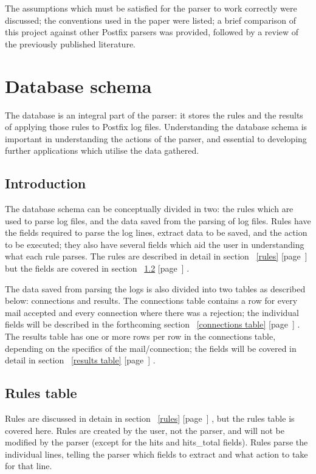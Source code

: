 \documentclass[a4paper,12pt,draft]{article}
\newcommand{\refwithpage}[1]{%
    \empty{}\ref{#1} [page~\pageref{#1}]%
}
\begin{document}
The assumptions which must be satisfied for the parser to work correctly
were discussed; the conventions used in the paper were listed; a brief
comparison of this project against other Postfix parsers was provided,
followed by a review of the previously published literature.

\section{Database schema}
\label{database schema}

The database is an integral part of the parser: it stores the rules and the
results of applying those rules to Postfix log files.  Understanding the
database schema is important in understanding the actions of the parser,
and essential to developing further applications which utilise the data
gathered.

\subsection{Introduction}

The database schema can be conceptually divided in two: the rules which are
used to parse log files, and the data saved from the parsing of log files.
Rules have the fields required to parse the log lines, extract data to be
saved, and the action to be executed; they also have several fields which
aid the user in understanding what each rule parses.  The rules are
described in detail in section~\refwithpage{rules} but the fields are
covered in section~\refwithpage{rule attributes}.

The data saved from parsing the logs is also divided into two tables as
described below: connections and results.  The connections table contains a
row for every mail accepted and every connection where there was a
rejection; the individual fields will be described in the forthcoming
section~\refwithpage{connections table}.  The results table has one or more
rows per row in the connections table, depending on the specifics of the
mail/connection; the fields will be covered in detail in
section~\refwithpage{results table}.

\subsection{Rules table}

\label{rule attributes}

Rules are discussed in detain in section~\refwithpage{rules}, but the rules
table is covered here.  Rules are created by the user, not the parser, and
will not be modified by the parser (except for the hits and hits\_total
fields).  Rules parse the individual lines, telling the parser which fields
to extract and what action to take for that line.
\end{document}
